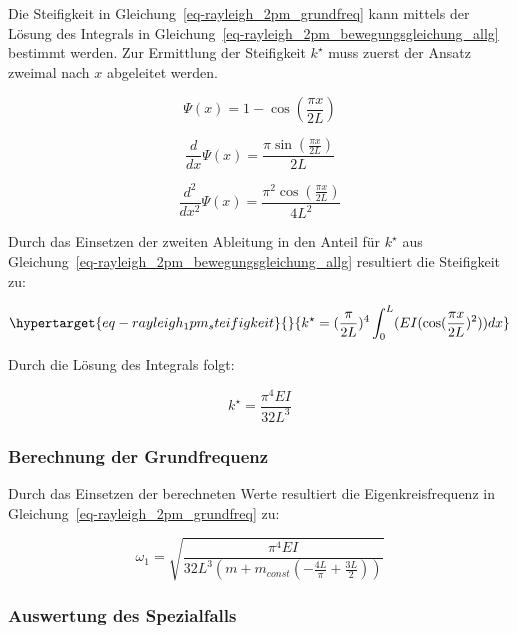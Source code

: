 \documentclass[
  letterpaper,
  DIV=11]{scrreprt}
\begin{document}
Die Steifigkeit in Gleichung~\ref{eq-rayleigh_2pm_grundfreq} kann
mittels der Lösung des Integrals in
Gleichung~\ref{eq-rayleigh_2pm_bewegungsgleichung_allg} bestimmt werden.
Zur Ermittlung der Steifigkeit \(k^\star\) muss zuerst der Ansatz
zweimal nach \(x\) abgeleitet werden.

\begin{equation}\Psi{\left(x \right)} = 1 - \cos{\left(\frac{\pi x}{2 L} \right)}\end{equation}

\begin{equation}\frac{d}{d x} \Psi{\left(x \right)} = \frac{\pi \sin{\left(\frac{\pi x}{2 L} \right)}}{2 L}\end{equation}

\begin{equation}\frac{d^{2}}{d x^{2}} \Psi{\left(x \right)} = \frac{\pi^{2} \cos{\left(\frac{\pi x}{2 L} \right)}}{4 L^{2}}\end{equation}

Durch das Einsetzen der zweiten Ableitung in den Anteil für \(k^\star\)
aus Gleichung~\ref{eq-rayleigh_2pm_bewegungsgleichung_allg} resultiert
die Steifigkeit zu:

\begin{equation}\protect\hypertarget{eq-rayleigh_1pm_steifigkeit}{}{
k^\star = (\frac{\pi}{2L})^4 \int_0^L(EI(\cos(\frac{\pi x}{2L})^2)) dx
}\label{eq-rayleigh_1pm_steifigkeit}\end{equation}

Durch die Lösung des Integrals folgt:

\begin{equation}k^{\star} = \frac{\pi^{4} E I}{32 L^{3}}\end{equation}

\hypertarget{berechnung-der-grundfrequenz-1}{%
\subsubsection{Berechnung der
Grundfrequenz}\label{berechnung-der-grundfrequenz-1}}

Durch das Einsetzen der berechneten Werte resultiert die
Eigenkreisfrequenz in Gleichung~\ref{eq-rayleigh_2pm_grundfreq} zu:

\begin{equation}\omega_{1} = \sqrt{\frac{\pi^{4} E I}{32 L^{3} \left(m + m_{const} \left(- \frac{4 L}{\pi} + \frac{3 L}{2}\right)\right)}}\end{equation}

\hypertarget{auswertung-des-spezialfalls-1}{%
\subsubsection{Auswertung des
Spezialfalls}\label{auswertung-des-spezialfalls-1}}
\end{document}
